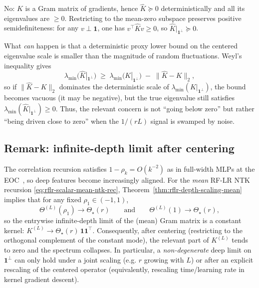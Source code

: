 \begin{remark}\label{rmk:lambda-min-negative-appendix}
No: \(\widehat{K}\) is a Gram matrix of gradients, hence \(\widehat{K}\succeq 0\) deterministically and all its eigenvalues are \(\ge 0\). Restricting to the mean-zero subspace preserves positive semidefiniteness: for any \(v\perp \mathbf{1}\), one has \(v^\top \widehat{K} v\ge 0\), so \(\widehat{K}|_{\mathbf{1}^\perp}\succeq 0\).

What \emph{can} happen is that a deterministic proxy lower bound on the centered eigenvalue scale is smaller than the magnitude of random fluctuations. Weyl's inequality gives
\[
\lambda_{\min}\!\bigl(\widehat{K}|_{\mathbf{1}^\perp}\bigr)\;\ge\;\lambda_{\min}\!\bigl(K|_{\mathbf{1}^\perp}\bigr)\;-\;\|\widehat{K}-K\|_{2},
\]
so if \(\|\widehat{K}-K\|_{2}\) dominates the deterministic scale of \(\lambda_{\min}(K|_{\mathbf{1}^\perp})\), the bound becomes vacuous (it may be negative), but the true eigenvalue still satisfies \(\lambda_{\min}(\widehat{K}|_{\mathbf{1}^\perp})\ge 0\). Thus, the relevant concern is not ``going below zero'' but rather ``being driven close to zero'' when the \(1/(rL)\) signal is swamped by noise.
\end{remark}

\subsection{Remark: infinite-depth limit after centering}\label{appendix:infinite-depth-limit}
\begin{remark}\label{rmk:infinite-depth-limit-appendix}
The correlation recursion satisfies \(1-\rho_k=O(k^{-2})\) as in full-width MLPs at the EOC~\cite{terjek2025mlpsateoc,pmlr-v163-hayou22a}, so deep features become increasingly aligned.
For the \emph{mean} RF-LR NTK recursion \eqref{eq:rflr-scalar-mean-ntk-rec}, Theorem~\ref{thm:rflr-depth-scaling-mean} implies that for any fixed \(\rho_1\in(-1,1)\),
\[
\Theta^{(L)}(\rho_1)\to \Theta_\star(r)\qquad\text{and}\qquad
\Theta^{(L)}(1)\to \Theta_\star(r),
\]
so the entrywise infinite-depth limit of the (mean) Gram matrix is a constant kernel: \(K^{(L)}\to \Theta_\star(r)\,\mathbf{1}\mathbf{1}^\top\).
Consequently, after centering (restricting to the orthogonal complement of the constant mode), the relevant part of \(K^{(L)}\) tends to zero and the spectrum collapses.
In particular, a \emph{non-degenerate} deep limit on \(\mathbf{1}^\perp\) can only hold under a joint scaling (e.g. \(r\) growing with \(L\)) or after an explicit rescaling of the centered operator (equivalently, rescaling time/learning rate in kernel gradient descent).
\end{remark}


